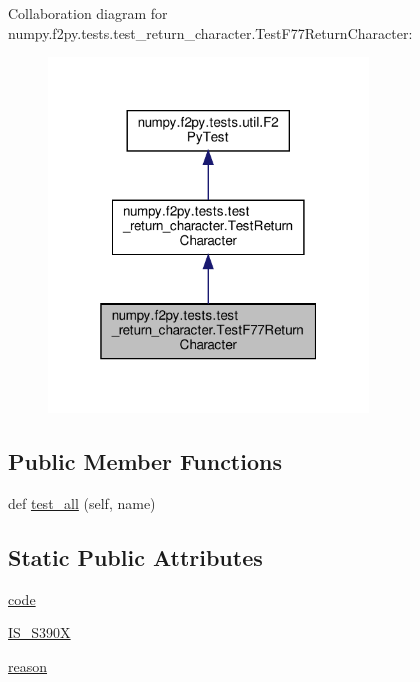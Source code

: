 Collaboration diagram for numpy.\+f2py.\+tests.\+test\+\_\+return\+\_\+character.\+Test\+F77\+Return\+Character\+:
\nopagebreak
\begin{figure}[H]
\begin{center}
\leavevmode
\includegraphics[width=241pt]{classnumpy_1_1f2py_1_1tests_1_1test__return__character_1_1TestF77ReturnCharacter__coll__graph}
\end{center}
\end{figure}
\subsection*{Public Member Functions}
\begin{DoxyCompactItemize}
\item 
def \hyperlink{classnumpy_1_1f2py_1_1tests_1_1test__return__character_1_1TestF77ReturnCharacter_ab7200f0eb18dea95af75909756a48316}{test\+\_\+all} (self, name)
\end{DoxyCompactItemize}
\subsection*{Static Public Attributes}
\begin{DoxyCompactItemize}
\item 
\hyperlink{classnumpy_1_1f2py_1_1tests_1_1test__return__character_1_1TestF77ReturnCharacter_a20e712ffc7c8278202a33568c307a19e}{code}
\item 
\hyperlink{classnumpy_1_1f2py_1_1tests_1_1test__return__character_1_1TestF77ReturnCharacter_a75018e1418b51177e4c185cdd19724d7}{I\+S\+\_\+\+S390X}
\item 
\hyperlink{classnumpy_1_1f2py_1_1tests_1_1test__return__character_1_1TestF77ReturnCharacter_aff70df918b7389d4cb29fab36f65bc8b}{reason}
\end{DoxyCompactItemize}


